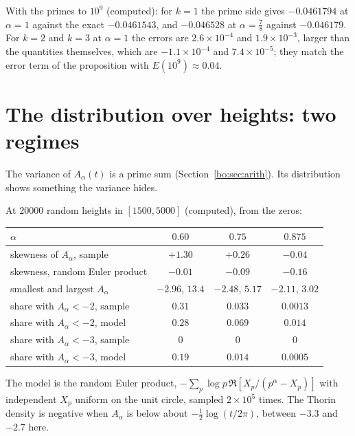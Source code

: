 \begin{computation}\label{bo:comp:moments}
With the primes to $10^9$ (computed): for $k=1$ the prime side gives $-0.0461794$ at $\alpha=1$ against the exact $-0.0461543$, and $-0.046528$ at $\alpha=\frac78$ against $-0.046179$. For $k=2$ and $k=3$ at $\alpha=1$ the errors are $2.6\times10^{-4}$ and $1.9\times10^{-3}$, larger than the quantities themselves, which are $-1.1\times10^{-4}$ and $7.4\times10^{-5}$; they match the error term of the proposition with $E(10^9)\approx0.04$.
\end{computation}

\section{The distribution over heights: two regimes}

The variance of $A_\alpha(t)$ is a prime sum (Section~\ref{bo:sec:arith}). Its distribution shows something the variance hides.

\begin{computation}\label{bo:comp:dist}
At $20000$ random heights in $[1500,5000]$ (computed), from the zeros:
\begin{center}\footnotesize
\begin{tabular}{@{}lccc@{}}
\toprule
$\alpha$ & $0.60$ & $0.75$ & $0.875$\\
\midrule
skewness of $A_\alpha$, sample & $+1.30$ & $+0.26$ & $-0.04$\\
skewness, random Euler product & $-0.01$ & $-0.09$ & $-0.16$\\
smallest and largest $A_\alpha$ & $-2.96$, $13.4$ & $-2.48$, $5.17$ & $-2.11$, $3.02$\\
share with $A_\alpha<-2$, sample & $0.31$ & $0.033$ & $0.0013$\\
share with $A_\alpha<-2$, model & $0.28$ & $0.069$ & $0.014$\\
share with $A_\alpha<-3$, sample & $0$ & $0$ & $0$\\
share with $A_\alpha<-3$, model & $0.19$ & $0.014$ & $0.0005$\\
\bottomrule
\end{tabular}
\end{center}
The model is the random Euler product, $-\sum_p\log p\,\Re[X_p/(p^{\alpha}-X_p)]$ with independent $X_p$ uniform on the unit circle, sampled $2\times10^5$ times. The Thorin density is negative when $A_\alpha$ is below about $-\frac12\log(t/2\pi)$, between $-3.3$ and $-2.7$ here.
\end{computation}

